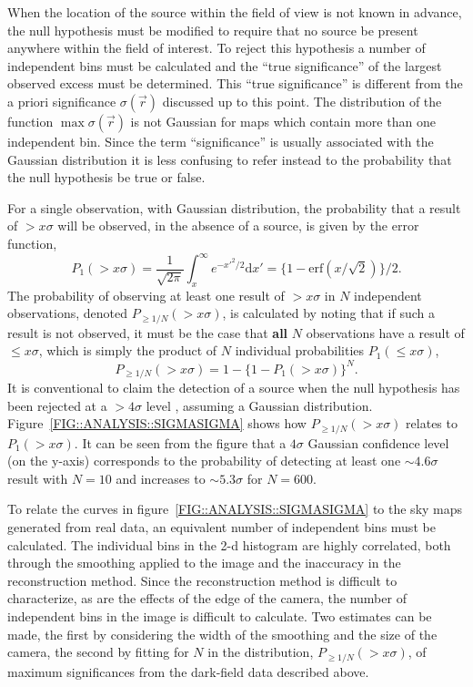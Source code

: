 When the location of the source within the field of view is not known
in advance, the null hypothesis must be modified to require that no
source be present anywhere within the field of interest. To reject
this hypothesis a number of independent bins must be calculated and the
``true significance'' of the largest observed excess must be
determined. This ``true significance'' is different from the a priori
significance $\sigma(\vec{r})$ discussed up to this point. The
distribution of the function $\max{\sigma(\vec{r})}$ is not Gaussian
for maps which contain more than one independent bin. Since the term
``significance'' is usually associated with the Gaussian distribution
it is less confusing to refer instead to the probability that the null
hypothesis be true or false.

For a single observation, with Gaussian distribution, the probability
that a result of $>x\sigma$ will be observed, in the absence of a \Gray
source, is given by the error function,
\[P_1(>x\sigma) = \frac{1}{\sqrt{2\pi}}\int_{x}^{\infty}e^{-x'^2/2}\mathrm{d}x' = \{1-\mathrm{erf}(x/\sqrt{2})\}/2.\]
The probability of observing at least one result of $>x\sigma$ in $N$
independent observations, denoted $P_{\geq 1/N}(>x\sigma)$, is
calculated by noting that if such a result is not observed, it must be
the case that \textbf{all} $N$ observations have a result of
$\leq x\sigma$, which is simply the product of $N$ individual
probabilities $P_1(\leq x\sigma)$,
\[P_{\geq 1/N}(>x\sigma) = 1 - \{1-P_1(>x\sigma)\}^N.\]
It is conventional to claim the detection of a source when the null
hypothesis has been rejected at a $>4\sigma$ level
\citep{REF::WEEKES::1999SNOWBIRD}, assuming a Gaussian distribution.
Figure~\ref{FIG::ANALYSIS::SIGMASIGMA} shows how $P_{\geq
1/N}(>x\sigma)$ relates to $P_1(>x\sigma)$. It can be seen from the
figure that a $4\sigma$ Gaussian confidence level (on the y-axis)
corresponds to the probability of detecting at least one
$\sim4.6\sigma$ result with $N=10$ and increases to $\sim5.3\sigma$
for $N=600$.

To relate the curves in figure~\ref{FIG::ANALYSIS::SIGMASIGMA} to the
sky maps generated from real data, an equivalent number of independent
bins must be calculated. The individual bins in the 2-d histogram are
highly correlated, both through the smoothing applied to the image and
the inaccuracy in the reconstruction method. Since the reconstruction
method is difficult to characterize, as are the effects of the edge of
the camera, the number of independent bins in the image is difficult to
calculate. Two estimates can be made, the first by considering the
width of the smoothing and the size of the camera, the second by
fitting for $N$ in the distribution, $P_{\geq 1/N}(>x\sigma)$, of
maximum significances from the dark-field data described above.


